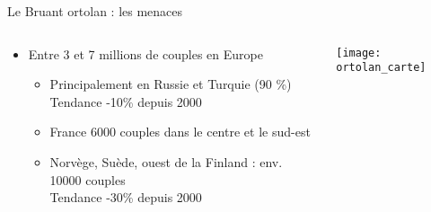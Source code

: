 \documentclass[10pt]{beamer}
\begin{document}
\begin{frame}{Le Bruant ortolan : les menaces}
    \begin{columns}[c]
    \begin{column}[c]{0.5\textwidth}
      \begin{itemize}[<+->]
      \item Entre 3 et 7 millions de couples en Europe
        \begin{itemize}
        \item Principalement en Russie et Turquie (90 \%) \\
          Tendance -10\% depuis 2000
        \item France 6000 couples dans le centre et le sud-est
        \item Norvège, Suède, ouest de la Finland : env. 10000
          couples \\
          Tendance -30\% depuis 2000 
       \end{itemize}
     \end{itemize}
    \end{column}
    \begin{column}[c]{0.5\textwidth}
      \begin{center}
          \texttt{[image: ortolan\_carte]}
      \end{center}
    \end{column}
  \end{columns}
\end{frame}
\end{document}

